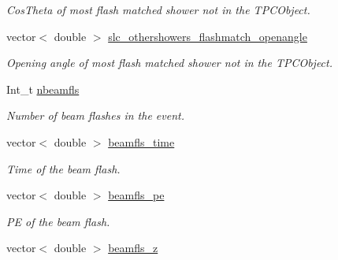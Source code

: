 \begin{DoxyCompactItemize}
\begin{DoxyCompactList}\small\item\em Cos\-Theta of most flash matched shower not in the T\-P\-C\-Object. \end{DoxyCompactList}\item 
\hypertarget{classUBXSecEvent_ae6dc19d0ebc058c1e4fd363488729d31}{vector$<$ double $>$ \hyperlink{classUBXSecEvent_ae6dc19d0ebc058c1e4fd363488729d31}{slc\-\_\-othershowers\-\_\-flashmatch\-\_\-openangle}}\label{classUBXSecEvent_ae6dc19d0ebc058c1e4fd363488729d31}

\begin{DoxyCompactList}\small\item\em Opening angle of most flash matched shower not in the T\-P\-C\-Object. \end{DoxyCompactList}\item 
\hypertarget{classUBXSecEvent_a2bf72740213db9d50d45c603eb3c549e}{Int\-\_\-t \hyperlink{classUBXSecEvent_a2bf72740213db9d50d45c603eb3c549e}{nbeamfls}}\label{classUBXSecEvent_a2bf72740213db9d50d45c603eb3c549e}

\begin{DoxyCompactList}\small\item\em Number of beam flashes in the event. \end{DoxyCompactList}\item 
\hypertarget{classUBXSecEvent_aff5ca08ec3a193029979e23b73d49d85}{vector$<$ double $>$ \hyperlink{classUBXSecEvent_aff5ca08ec3a193029979e23b73d49d85}{beamfls\-\_\-time}}\label{classUBXSecEvent_aff5ca08ec3a193029979e23b73d49d85}

\begin{DoxyCompactList}\small\item\em Time of the beam flash. \end{DoxyCompactList}\item 
\hypertarget{classUBXSecEvent_a3d703c077ccb0b00cacd04c6e751a2eb}{vector$<$ double $>$ \hyperlink{classUBXSecEvent_a3d703c077ccb0b00cacd04c6e751a2eb}{beamfls\-\_\-pe}}\label{classUBXSecEvent_a3d703c077ccb0b00cacd04c6e751a2eb}

\begin{DoxyCompactList}\small\item\em P\-E of the beam flash. \end{DoxyCompactList}\item 
\hypertarget{classUBXSecEvent_ac30df357368262d7a103ae9cd0bbd0d3}{vector$<$ double $>$ \hyperlink{classUBXSecEvent_ac30df357368262d7a103ae9cd0bbd0d3}{beamfls\-\_\-z}}\label{classUBXSecEvent_ac30df357368262d7a103ae9cd0bbd0d3}


\end{DoxyCompactItemize}
